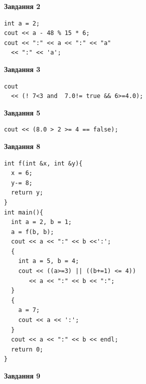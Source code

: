 \documentclass[12pt, ukrainian]{article}
\begin{document}
{\begin {large}
\begin{minipage}[t]{7.0cm}
\end{minipage}
\vline \hspace{1mm}
\begin{minipage}[t]{11.0cm}

\begin{center}
\textbf{Завдання 2}
\end{center}
\vspace{-8mm}

\begin{verbatim}
int a = 2;
cout << a - 48 % 15 * 6;
cout << ":" << a << ":" << "a" 
  << ":" << 'a';
\end{verbatim}



\begin{center}
\textbf{Завдання 3}
\end{center}
\vspace{-8mm}

\begin{verbatim}
cout 
  << (! 7<3 and  7.0!= true && 6>=4.0);
\end{verbatim}



\begin{center}
\textbf{Завдання 5}
\end{center}
\vspace{-8mm}

\begin{verbatim}
cout << (8.0 > 2 >= 4 == false);
\end{verbatim}



\begin{center}
\textbf{Завдання 8}
\end{center}
\vspace{-8mm}

\begin{verbatim}
int f(int &x, int &y){
  x = 6;
  y-= 8;
  return y;
}
int main(){
  int a = 2, b = 1;
  a = f(b, b);
  cout << a << ":" << b <<':';
  {
    int a = 5, b = 4;
    cout << ((a>=3) || ((b+=1) <= 4))
       << a << ":" << b << ":";
  }
  {
    a = 7;
    cout << a << ':';
  }
  cout << a << ":" << b << endl;
  return 0;
}
\end{verbatim}

\end{minipage}


\begin{minipage}[t]{7.0cm}

\begin{center}
\textbf{Завдання 9}
\end{center}
\vspace{-8mm}


\end{minipage}
\end{large}}
\end{document}
